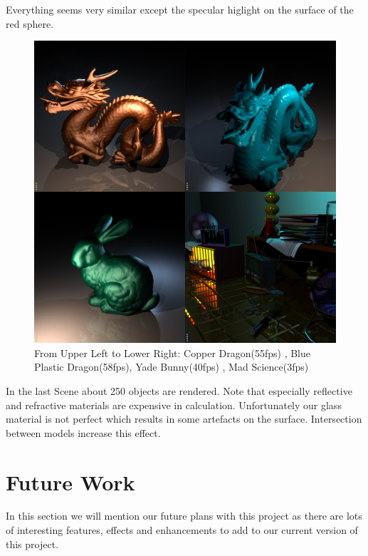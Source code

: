 \documentclass[11pt,a4paper]{article}
\begin{document}
Everything seems very similar except the specular higlight on the surface of the red sphere. 

\begin{figure}[H]

\includegraphics[width=\textwidth]{results.png}
\caption{From Upper Left to Lower Right: Copper Dragon(55fps) \cite{SU}, Blue Plastic Dragon(58fps), Yade Bunny(40fps) \cite{SU}, Mad Science(3fps) \cite{LC}}
\end{figure}

In the last Scene about 250 objects are rendered. Note that especially reflective and refractive materials are expensive in calculation. Unfortunately our glass material is not perfect which results in some artefacts on the surface. Intersection between models increase this effect.



\newpage
\section{Future Work}
In this section we will mention our future plans with this project as there are lots of interesting features, effects and enhancements to add to our current version of this project.
\end{document}
